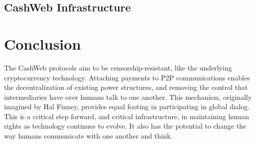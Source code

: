 \documentclass{article}
\begin{document}
\subsection{CashWeb Infrastructure}


\section{Conclusion}

The CashWeb protocols aim to be censorship-resistant, like the underlying cryptocurrency technology. Attaching payments to P2P communications enables the decentralization of existing power structures, and removing the control that intermediaries have over humans talk to one another. This mechanism, originally imagined by Hal Finney\cite{finney2004rpow}, provides equal footing in participating in global dialog. This is a critical step forward, and critical infrastructure, in maintaining human rights as technology continues to evolve. It also has the potential to change the way humans communicate with one another and think.

\cite{nakamoto2008bpp}




\end{document}
